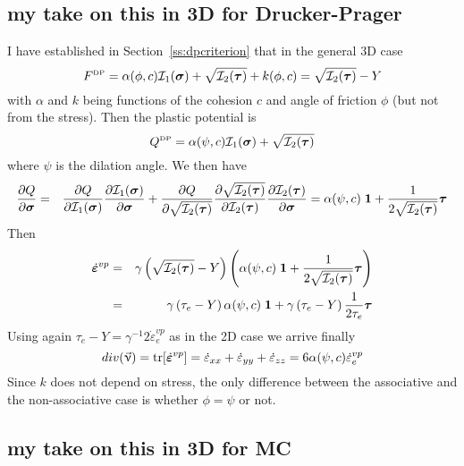 \subsection{my take on this in 3D for Drucker-Prager}


I have established in Section~\ref{ss:dpcriterion} that in the general 3D case
\begin{equation}
F^{\text{\tiny DP}}= \alpha(\phi,c) {\cal I}_1({\bm \sigma}) + \sqrt{ {\cal I}_2({\bm \tau})  } + k(\phi,c) 
=\sqrt{  {\cal I}_2({\bm \tau})  } -Y 
\end{equation}
with $\alpha$ and $k$ being functions of the cohesion $c$ and angle of friction $\phi$ 
(but not from the stress). Then the plastic potential is
\begin{equation}
Q^{\text{\tiny DP}}= \alpha(\psi,c) {\cal I}_1({\bm \sigma})   +  \sqrt{  {\cal I}_2({\bm \tau})  } 
\end{equation}
where $\psi$ is the dilation angle.
We then have
\begin{eqnarray}
\frac{\partial Q}{\partial \bm\sigma} 
&=&
\frac{\partial Q}{\partial {\cal I}_1(\bm\sigma)} 
\frac{\partial {\cal I}_1(\bm\sigma)}{\partial \bm\sigma} 
+
\frac{\partial Q}{\partial \sqrt{{\cal I}_2(\bm\tau)}} 
\frac{\partial \sqrt{ {\cal I}_2(\bm\tau)}   }{\partial {\cal I}_2(\bm\tau)} 
\frac{\partial {\cal I}_2(\bm\tau)}{\partial \bm\sigma} 
=
\alpha(\psi,c) \; {\bm 1} + \frac{1}{2 \sqrt{ {\cal I}_2(\bm\tau)}} 
\bm\tau
\end{eqnarray}
Then 
\begin{eqnarray}
\dot{\bm \varepsilon}^{vp} 
&=& \gamma \left(\sqrt{{\cal I}_2(\bm\tau)} - Y \right)
\left(\alpha(\psi,c) \;  {\bm 1} + \frac{1}{2 \sqrt{{\cal I}_2(\bm \tau)}} {\bm \tau} \right) \nonumber\\
&=& \gamma \left(\tau_e - Y \right)
\alpha(\psi,c) \;  {\bm 1} 
+  
\gamma \left(\tau_e - Y \right)
\frac{1}{2 \tau_e} {\bm \tau}  
\end{eqnarray}
Using again $\tau_e - Y = \gamma^{-1} 2  \dot\varepsilon_e^{vp}$ as in the 2D case 
we arrive finally
\[
div (\vec\upnu)=
{\rm tr}[\dot{\bm \varepsilon}^{vp}]=
\dot{\varepsilon}_{xx}
+
\dot{\varepsilon}_{yy}
+
\dot{\varepsilon}_{zz}
=
6 \alpha(\psi,c) \dot\varepsilon_e^{vp}
\]
Since $k$ does not depend on stress, the only difference between the associative
and the non-associative case is whether $\phi=\psi$ or not.

\subsection{my take on this in 3D for MC}

